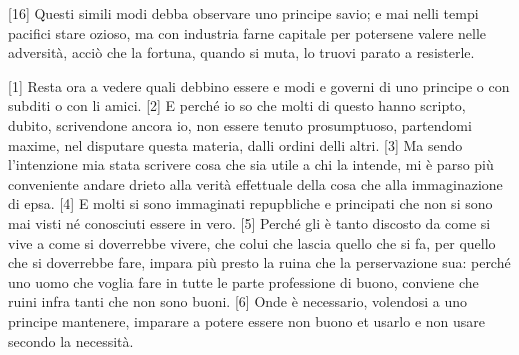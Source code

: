 {[}16{]} Questi simili modi debba observare uno principe savio; e mai
nelli tempi pacifici stare ozioso, ma con industria farne capitale per
potersene valere nelle adversità, acciò che la fortuna, quando si muta,
lo truovi parato a resisterle.


{[}1{]} Resta ora a vedere quali debbino essere e modi e governi di uno
principe o con subditi o con li amici. {[}2{]} E perché io so che molti
di questo hanno scripto, dubito, scrivendone ancora io, non essere
tenuto prosumptuoso, partendomi maxime, nel disputare questa materia,
dalli ordini delli altri. {[}3{]} Ma sendo l'intenzione mia stata
scrivere cosa che sia utile a chi la intende, mi è parso più conveniente
andare drieto alla verità effettuale della cosa che alla immaginazione
di epsa. {[}4{]} E molti si sono immaginati repupbliche e principati che
non si sono mai visti né conosciuti essere in vero. {[}5{]} Perché gli è
tanto discosto da come si vive a come si doverrebbe vivere, che colui
che lascia quello che si fa, per quello che si doverrebbe fare, impara
più presto la ruina che la perservazione sua: perché uno uomo che voglia
fare in tutte le parte professione di buono, conviene che ruini infra
tanti che non sono buoni. {[}6{]} Onde è necessario, volendosi a uno
principe mantenere, imparare a potere essere non buono et usarlo e non
usare secondo la necessità.

